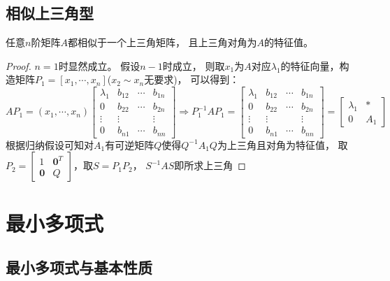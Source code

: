 \subsection{相似上三角型}

\begin{theorem}[相似上三角型]
  任意$n$阶矩阵$A$都相似于一个上三角矩阵，
  且上三角对角为$A$的特征值。
\end{theorem}

\begin{proof}
  $n = 1$时显然成立。
  假设$n - 1$时成立，
  则取$x_1$为$A$对应$\lambda_1$的特征向量，构造矩阵$P_1 = [x_1,\cdots,x_n]$($x_2 \sim x_n$无要求)，
  可以得到：
  \begin{equation*}
    A P_1 = (x_1,\cdots,x_n) \left[
      \begin{array}{cccc}
        \lambda_1&b_{12}&\cdots&b_{1n}\\
        0&b_{22}&\cdots& b_{2n}\\
        \vdots&\vdots&&\vdots\\
        0&b_{n1}&\cdots&b_{nn}
      \end{array}
    \right] \Rightarrow P_1^{-1}AP_1 =
    \left[
      \begin{array}{cccc}
        \lambda_1&b_{12}&\cdots&b_{1n}\\
        0&b_{22}&\cdots& b_{2n}\\
        \vdots&\vdots&&\vdots\\
        0&b_{n1}&\cdots&b_{nn}
      \end{array}
    \right] = 
    \left[
      \begin{array}{cc}
        \lambda_1&*\\
        0&A_1
      \end{array}
    \right]
  \end{equation*}
  根据归纳假设可知对$A_1$有可逆矩阵$Q$使得$Q^{-1}A_1Q$为上三角且对角为特征值，
  取$P_2 = \left[
    \begin{array}{cc}
      1&\mathbf{0}^T\\
      \mathbf{0}&Q
    \end{array}
  \right]$，取$S = P_1P_2$，
  $S^{-1}AS$即所求上三角
\end{proof}



\section{最小多项式}

\subsection{最小多项式与基本性质}

